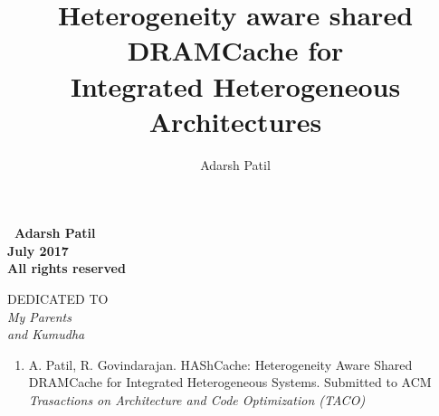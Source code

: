 \documentclass[12pt,twoside,a4paper, openright]{report}
\begin{document}
\begin{frontmatter}
\title{Heterogeneity aware shared DRAMCache for \\ Integrated Heterogeneous Architectures}
\author{Adarsh Patil}
\enggfaculty
{}
\mscengg
\iisclogotrue %
\figurespagefalse %
\tablespagetrue %
\maketitle

\vspace*{\fill}
\begin{center}
	\large\bf \textcopyright \ Adarsh Patil\\
	\large\bf July 2017\\
	\large\bf All rights reserved
\end{center}
\vspace*{\fill}
\thispagestyle{empty}


\begin{dedication}
\newpage
\vspace*{\fill}
\begin{center}
	DEDICATED TO \\[2em]
	\Large\it My Parents \\ and Kumudha
\end{center}
\vspace*{\fill}
\thispagestyle{empty}
\newpage
\thispagestyle{empty}
\end{dedication}


\acknowledgements
{}



\publications
\begin{enumerate}
	\item A. Patil, R. Govindarajan. HAShCache: Heterogeneity Aware Shared DRAMCache for Integrated Heterogeneous Systems. Submitted to ACM \textit{Trasactions on Architecture and Code Optimization (TACO)}
\end{enumerate}



\begin{abstract}

\end{abstract}

\makecontents

	
\cleardoublepage
{}
\listoffigures

\newpage
{}
\listofalgorithms
\newpage
\thispagestyle{empty}
\cleardoublepage


\end{frontmatter}















\end{document}
